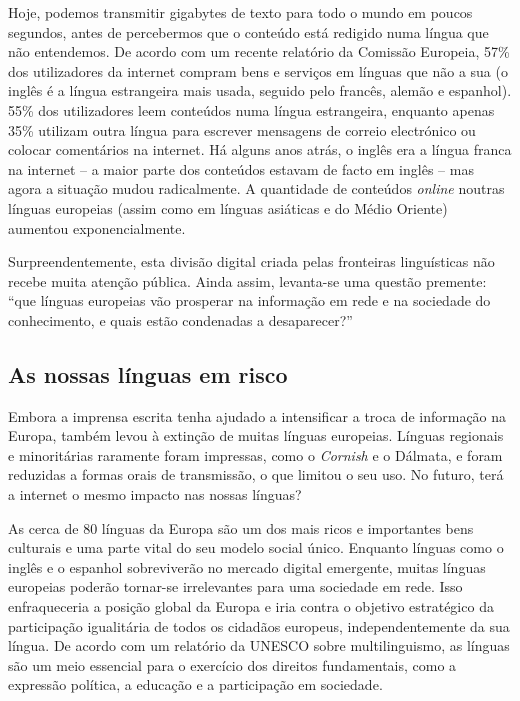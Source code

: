 \documentclass[]{../metanetpaper}
\begin{document}
\begin{multicols}{2}

Hoje, podemos transmitir gigabytes de texto para todo o mundo em poucos segundos, antes de percebermos que o conteúdo está redigido numa língua que não entendemos. De acordo com um recente relatório da Comissão Europeia, 57\% dos utilizadores da internet compram bens e serviços em línguas que não a sua (o inglês é a língua estrangeira mais usada, seguido pelo francês, alemão e espanhol). 55\% dos utilizadores leem conteúdos numa língua estrangeira, enquanto apenas 35\% utilizam outra língua para escrever mensagens de correio electrónico ou colocar comentários na internet\cite{EC1}. Há alguns anos atrás, o inglês era a língua franca na internet – a maior parte dos conteúdos estavam de facto em inglês – mas agora a si\-tua\-ção mudou radicalmente. A quantidade de conteúdos \textit{online} noutras línguas europeias (assim como em línguas asiáticas e do Médio Oriente) aumentou exponencialmente.

Surpreendentemente, esta divisão digital criada pelas fronteiras linguísticas não recebe muita atenção pública. Ainda assim, levanta-se uma questão premente: “que línguas europeias vão prosperar na informação em rede e na sociedade do co\-nhe\-ci\-men\-to, e quais estão condenadas a desaparecer?”

\subsection{As nossas línguas em risco}

 Embora a imprensa escrita tenha ajudado a intensificar a troca de informação na Europa, também levou à extinção de muitas línguas europeias. Línguas regionais e minoritárias raramente foram impressas, como o \textit{Cornish} e o Dálmata, e foram reduzidas a formas orais de transmissão, o que limitou o seu uso. No futuro, terá a internet o mesmo impacto nas nossas línguas?

As cerca de 80 línguas da Europa são um dos mais ricos e importantes bens culturais e uma parte vital do seu modelo social único\cite{EC2}. Enquanto línguas como o inglês e o espanhol sobreviverão no mercado digital emergente, muitas línguas europeias poderão tornar-se irrelevantes para uma sociedade em rede. Isso enfraqueceria a posição global da Europa e iria contra o objetivo estratégico da participação igualitária de todos os cidadãos europeus, independentemente da sua língua. De acordo com um relatório da UNESCO sobre multilinguismo, as línguas são um meio essencial para o exercício dos direitos fundamentais, como a expressão política, a educação e a participação em sociedade\cite{Unesco1}.


\end{multicols}
\end{document}
